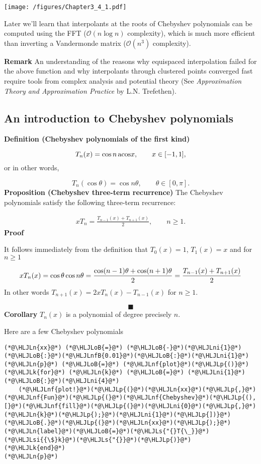 \documentclass[12pt,a4paper]{article}
\newcommand{\HLJLk}[1]{\textcolor[RGB]{148,91,176}{\textbf{#1}}}
\newcommand{\HLJLn}[1]{#1}
\newcommand{\HLJLnf}[1]{\textcolor[RGB]{66,102,213}{#1}}
\newcommand{\HLJLs}[1]{\textcolor[RGB]{201,61,57}{#1}}
\newcommand{\HLJLsi}[1]{#1}
\newcommand{\HLJLnfB}[1]{\textcolor[RGB]{59,151,46}{#1}}
\newcommand{\HLJLni}[1]{\textcolor[RGB]{59,151,46}{#1}}
\newcommand{\HLJLoB}[1]{\textcolor[RGB]{102,102,102}{\textbf{#1}}}
\newcommand{\HLJLp}[1]{#1}
\begin{document}
\texttt{[image: /figures/Chapter3\_4\_1.pdf]}

Later we'll learn that interpolants at the roots of Chebyshev polynomials can be computed using the FFT ($\mathcal{O}(n\log n)$ complexity), which is much more efficient than inverting a Vandermonde matrix ($\mathcal{O}(n^3)$ complexity). 

\textbf{Remark}  An understanding of the reasons why equispaced interpolation failed for the above function and why interpolants through clustered points converged fast require tools from complex analysis and potential theory (See \emph{Approximation Theory and Approximation Practice} by L.N. Trefethen).

\subsection{An introduction to Chebyshev polynomials}
\textbf{Definition (Chebyshev polynomials of the first kind)}

\[
T_n(x) = \cos n\, {\rm acos} x, \qquad x \in [-1, 1],
\]
or in other words,

\[
T_n(\cos \theta) = \cos n \theta, \qquad \theta \in [0, \pi].
\]
\textbf{Proposition (Chebyshev three-term recurrence)}  The Chebyshev polynomials satisfy the following three-term recurrence:


\begin{align*}
xT_{n} = \frac{T_{n-1}(x) + T_{n+1}(x)}{2}, \qquad n \geq 1.
\end{align*}
\textbf{Proof}

It follows immediately from the definition that $T_0(x) = 1$, $T_{1}(x) = x$ and for $n \geq 1$

\[
x T_n(x) = \cos \ensuremath{\theta} \cos n \ensuremath{\theta} = {\cos(n-1)\ensuremath{\theta} + \cos(n+1)\ensuremath{\theta} \over 2} = {T_{n-1}(x) + T_{n+1}(x) \over 2}
\]
In other words $T_{n+1}(x) = 2x T_n(x) - T_{n-1}(x)$ for $n \geq 1$.

\[
\blacksquare
\]
\textbf{Corollary} $T_n(x)$ is a polynomial of degree precisely $n$.

Here are a few Chebyshev polynomials


\begin{lstlisting}
(*@\HLJLn{xx}@*) (*@\HLJLoB{=}@*) (*@\HLJLoB{-}@*)(*@\HLJLni{1}@*)(*@\HLJLoB{:}@*)(*@\HLJLnfB{0.01}@*)(*@\HLJLoB{:}@*)(*@\HLJLni{1}@*)
(*@\HLJLn{p}@*) (*@\HLJLoB{=}@*) (*@\HLJLnf{plot}@*)(*@\HLJLp{()}@*)
(*@\HLJLk{for}@*) (*@\HLJLn{k}@*) (*@\HLJLoB{=}@*) (*@\HLJLni{1}@*)(*@\HLJLoB{:}@*)(*@\HLJLni{4}@*)
    (*@\HLJLnf{plot!}@*)(*@\HLJLp{(}@*)(*@\HLJLn{xx}@*)(*@\HLJLp{,}@*)(*@\HLJLnf{Fun}@*)(*@\HLJLp{(}@*)(*@\HLJLnf{Chebyshev}@*)(*@\HLJLp{(),[}@*)(*@\HLJLnf{fill}@*)(*@\HLJLp{(}@*)(*@\HLJLni{0}@*)(*@\HLJLp{,}@*)(*@\HLJLn{k}@*)(*@\HLJLp{);}@*)(*@\HLJLni{1}@*)(*@\HLJLp{])}@*)(*@\HLJLoB{.}@*)(*@\HLJLp{(}@*)(*@\HLJLn{xx}@*)(*@\HLJLp{);}@*)(*@\HLJLn{label}@*)(*@\HLJLoB{=}@*)(*@\HLJLs{"{}T{\_}}@*)(*@\HLJLsi{{\$}k}@*)(*@\HLJLs{"{}}@*)(*@\HLJLp{)}@*)
(*@\HLJLk{end}@*)
(*@\HLJLn{p}@*)
\end{lstlisting}
\end{document}
